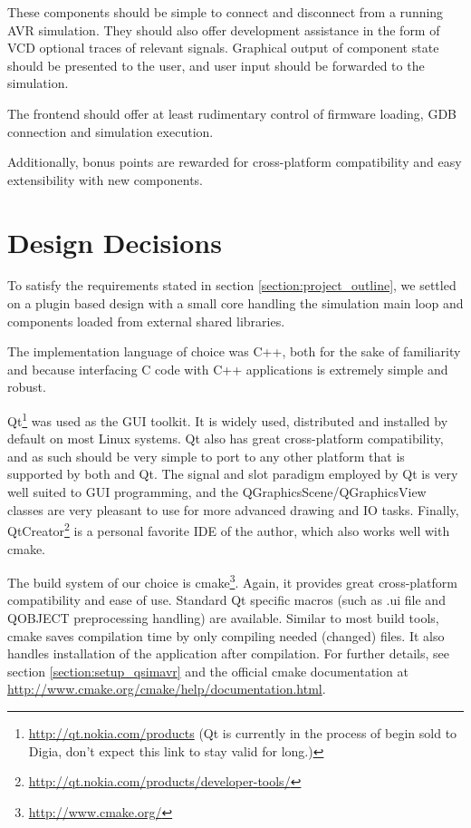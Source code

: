 These components should be simple to connect and disconnect from a running \ac{AVR}
simulation. They should also offer development assistance in the form of \ac{VCD}
optional traces of relevant signals. Graphical output of component state should
be presented to the user, and user input should be forwarded to the simulation.

The frontend should offer at least rudimentary control of firmware
loading, \ac{GDB} connection and simulation execution.

Additionally, bonus points are rewarded for cross-platform compatibility and
easy extensibility with new components.

\section{Design Decisions} \label{section:design_principles}

To satisfy the requirements stated in section \ref{section:project_outline},
we settled on a plugin based design with a small core handling the simulation main
loop and components loaded from external shared libraries.

The implementation language of choice was C++, both for the sake of familiarity
and because interfacing C code with C++ applications is extremely simple and
robust.

Qt\footnote{
%
\url{http://qt.nokia.com/products} (Qt is currently in the process of begin sold
to Digia, don't expect this link to stay valid for long.)
%
} was used as the \ac{GUI} toolkit. It is widely used, distributed and installed
by default on most Linux systems. Qt also has great cross-platform compatibility,
and as such \qsimavr should be very simple to port to any other platform that
is supported by both \simavr and Qt. The signal and slot paradigm employed by
Qt is very well suited to \ac{GUI} programming, and the
QGraphicsScene/QGraphicsView classes are very pleasant to use for more advanced
drawing and \ac{IO} tasks. Finally, QtCreator\footnote{
%
\url{http://qt.nokia.com/products/developer-tools/}
%
} is a personal favorite \ac{IDE} of
the author, which also works well with cmake.

The build system of our choice is cmake\footnote{\url{http://www.cmake.org/}}.
Again, it provides great cross-platform
compatibility and ease of use. Standard Qt specific macros (such as .ui file and
QOBJECT preprocessing handling) are available. Similar to most build tools, cmake
saves compilation time by only compiling needed (changed) files. It also handles
installation of the application after compilation. For further details, see
section \ref{section:setup_qsimavr} and the official cmake documentation at
\url{http://www.cmake.org/cmake/help/documentation.html}.